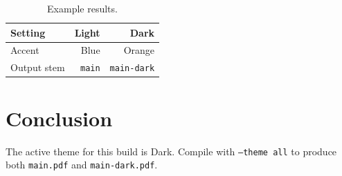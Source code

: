 \documentclass[11pt,a4paper]{report}
\def\lhthemevalue{Light}
\def\lhthemevalue{Dark}
\providecommand{\lhbar}{}
\providecommand{\lhfootertext}{}
\begin{document}
\begin{table}[htbp]
  \centering
  \begin{tabular}{lrr}
    \hline
    Setting & Light & Dark \\
    \hline
    Accent & Blue & Orange \\
    Output stem & \texttt{main} & \texttt{main-dark} \\
    \hline
  \end{tabular}
  \caption{Example results.}
  \label{tab:example}
\end{table}

\chapter{Conclusion}
The active theme for this build is \lhthemevalue. Compile with
\texttt{--theme all} to produce both \texttt{main.pdf} and
\texttt{main-dark.pdf}.

\lhbar
\noindent\small\lhfootertext
\end{document}
